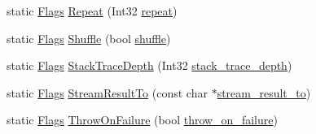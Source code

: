 \begin{DoxyCompactItemize}
\item 
static \hyperlink{structtesting_1_1Flags}{Flags} \hyperlink{structtesting_1_1Flags_a19d47e87d77a18ef4fa8a85b74e25956}{Repeat} (Int32 \hyperlink{structtesting_1_1Flags_a61614dd07f97f6e04d27c004ff15195e}{repeat})
\item 
static \hyperlink{structtesting_1_1Flags}{Flags} \hyperlink{structtesting_1_1Flags_a19ddbbaed61bda44a1940333b7c5a469}{Shuffle} (bool \hyperlink{structtesting_1_1Flags_a51c689e47e0f55c16116ac2a1d3b05d6}{shuffle})
\item 
static \hyperlink{structtesting_1_1Flags}{Flags} \hyperlink{structtesting_1_1Flags_a16b01d8bcceaa9fa8211fd24faa75b5a}{Stack\+Trace\+Depth} (Int32 \hyperlink{structtesting_1_1Flags_a20c6592453909c1adace64bf6a2bc2de}{stack\+\_\+trace\+\_\+depth})
\item 
static \hyperlink{structtesting_1_1Flags}{Flags} \hyperlink{structtesting_1_1Flags_a9cf0f64310b28eadbbfbb35584ebfc71}{Stream\+Result\+To} (const char $\ast$\hyperlink{structtesting_1_1Flags_ab09849fd3e095d5628dec65ec4dce9e1}{stream\+\_\+result\+\_\+to})
\item 
static \hyperlink{structtesting_1_1Flags}{Flags} \hyperlink{structtesting_1_1Flags_ad856df862414ed0dadf80b5e03829cc7}{Throw\+On\+Failure} (bool \hyperlink{structtesting_1_1Flags_ab8e7d21e31e641efe47b8050759e001a}{throw\+\_\+on\+\_\+failure})
\end{DoxyCompactItemize}
